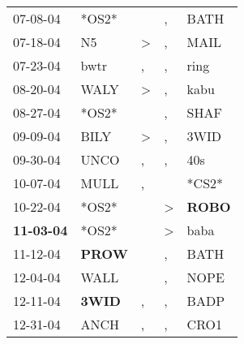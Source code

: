 \begin{supertabular}{p{0.07\textwidth}p{0.06\textwidth}p{0.02\textwidth}p{0.02\textwidth}p{0.06\textwidth}}
          07-08-04\textsuperscript{} &                            *OS2* &                  &                , &           BATH\textsuperscript{} \\
          07-18-04\textsuperscript{} &             N5\textsuperscript{} &     \textgreater &                , &           MAIL\textsuperscript{} \\
          07-23-04\textsuperscript{} &           bwtr\textsuperscript{} &                , &                , &           ring\textsuperscript{} \\
          08-20-04\textsuperscript{} &           WALY\textsuperscript{} &     \textgreater &                , &           kabu\textsuperscript{} \\
          08-27-04\textsuperscript{} &                            *OS2* &                  &                , &           SHAF\textsuperscript{} \\
          09-09-04\textsuperscript{} &           BILY\textsuperscript{} &     \textgreater &                , &           3WID\textsuperscript{} \\
          09-30-04\textsuperscript{} &           UNCO\textsuperscript{} &                , &                , &            40s\textsuperscript{} \\
          10-07-04\textsuperscript{} &           MULL\textsuperscript{} &                , &                  &                            *CS2* \\
          10-22-04\textsuperscript{} &                            *OS2* &                  &     \textgreater &  \textbf{ROBO\textsuperscript{}} \\
 \textbf{11-03-04\textsuperscript{}} &                            *OS2* &                  &     \textgreater &           baba\textsuperscript{} \\
          11-12-04\textsuperscript{} &  \textbf{PROW\textsuperscript{}} &                  &                , &           BATH\textsuperscript{} \\
          12-04-04\textsuperscript{} &           WALL\textsuperscript{} &                  &                , &           NOPE\textsuperscript{} \\
          12-11-04\textsuperscript{} &  \textbf{3WID\textsuperscript{}} &                , &                , &           BADP\textsuperscript{} \\
          12-31-04\textsuperscript{} &           ANCH\textsuperscript{} &                , &                , &           CRO1\textsuperscript{} \\

\end{supertabular}
